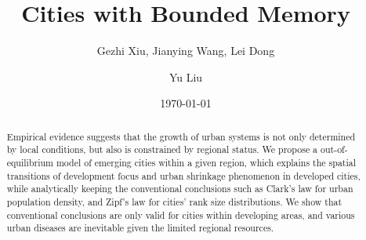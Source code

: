 \documentclass[reprint,unsortedaddress,amsmath,amssymb,aps,prl,fixfloat,showkeys]{revtex4-2}
\begin{document}
\title{Cities with Bounded Memory}
\author{Gezhi Xiu, Jianying Wang, Lei Dong}
\author{Yu Liu}
\date{\today}

\begin{abstract}
	Empirical evidence suggests that the growth of urban systems is not only determined by local conditions, but also is constrained by regional status. We propose a out-of-equilibrium model of emerging cities within a given region, which explains the spatial transitions of development focus and urban shrinkage phenomenon in developed cities, while analytically keeping the conventional conclusions such as Clark's law for urban population density, and Zipf's law for cities' rank size distributions. We show that conventional conclusions are only valid for cities within developing areas, and various urban diseases are inevitable given the limited regional resources. 
\end{abstract}

\maketitle
\end{document}
